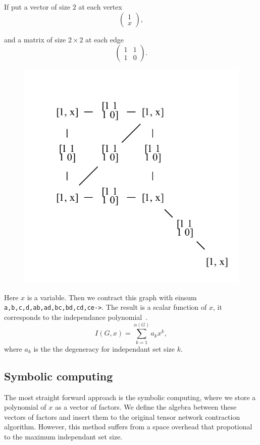 \documentclass{article}
\newcommand{\<}{\langle}
\renewcommand{\>}{\rangle}
\renewcommand{\cite}[1]{{\citep{#1}}}
\theoremstyle{definition}\newtheorem{definition}{\textit{Definition}}
\begin{document}
If put a vector of size $2$ at each vertex
\begin{equation}
    \left(\begin{matrix}
        1 \\
        x
    \end{matrix}\right),
\end{equation}

and a matrix of size $2 \times 2$ at each edge
\begin{equation}
    \left(\begin{matrix}
        1  & 1\\
        1 & 0
    \end{matrix}\right).
\end{equation}

\begin{figure}[H]
    \centerline{\includegraphics[width=0.4\columnwidth,trim={0 0cm 0 0},clip]{../notebooks/fig2.pdf}}
\end{figure}

Here $x$ is a variable. Then we contract this graph with einsum \texttt{a,b,c,d,ab,ad,bc,bd,cd,ce->}.
The result is a scalar function of $x$, it corresponds to the independance polynomial~\cite{}.
\begin{equation}
I(G, x) = \sum_{k=1}^{\alpha(G)} a_k x^k,
\end{equation}
where $a_k$ is the the degeneracy for independant set size $k$.

\subsection{Symbolic computing}
The most straight forward approach is the symbolic computing, where we store a polynomial of $x$ as a vector of factors.
We define the algebra between these vectors of factors and insert them to the original tensor network contraction algorithm.
However, this method suffers from a space overhead that propotional to the maximum independant set size.
\end{document}
